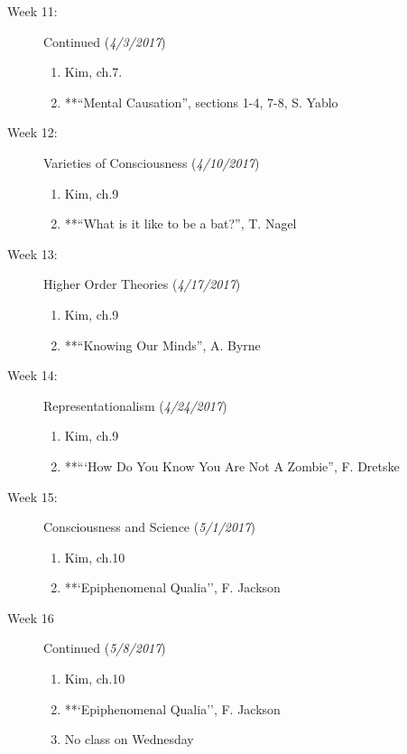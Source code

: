 \documentclass[article,oneside]{memoir}
\begin{document}
\begin{description}
\item[Week 11:] Continued (\emph{4/3/2017})
\begin{enumerate}
\item Kim, ch.7. 
\item **``Mental Causation'', sections 1-4, 7-8, S. Yablo
\end{enumerate}

\item[Week 12:] Varieties of Consciousness (\emph{4/10/2017})
\begin{enumerate}
\item Kim, ch.9
\item **``What is it like to be a bat?'', T. Nagel
\end{enumerate}

\item[Week 13:] Higher Order Theories (\emph{4/17/2017})
\begin{enumerate}
\item Kim, ch.9
\item**``Knowing Our Minds'', A. Byrne
\end{enumerate}


\item[Week 14:] Representationalism  (\emph{4/24/2017})
\begin{enumerate}
\item Kim, ch.9
\item **``‘How Do You Know You Are Not A Zombie'', F. Dretske 
\end{enumerate}

\item[Week 15:] Consciousness and Science (\emph{5/1/2017})
\begin{enumerate}
\item Kim, ch.10
\item**`Epiphenomenal Qualia'', F. Jackson 
\end{enumerate}


\item[Week 16]  Continued  (\emph{5/8/2017})
\begin{enumerate}
\item  Kim, ch.10
\item**`Epiphenomenal Qualia'', F. Jackson 
\item No class on Wednesday
\end{enumerate}



\end{description}
\end{document}

